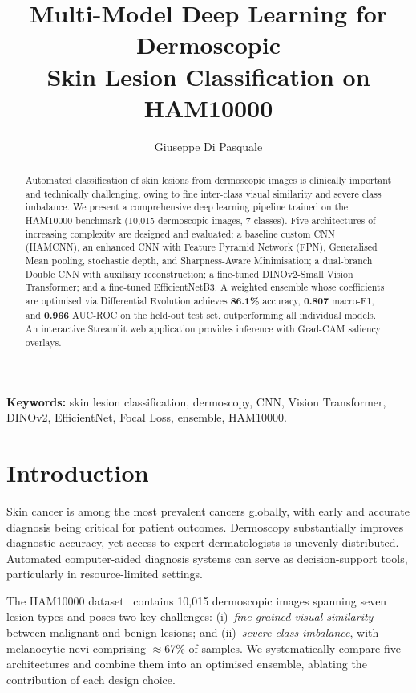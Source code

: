 \documentclass[10pt,twocolumn]{article}
\title{%
  \large\textbf{Multi-Model Deep Learning for Dermoscopic\\
  Skin Lesion Classification on HAM10000}
}
\author[1]{Giuseppe Di Pasquale}
\begin{document}
\maketitle
\thispagestyle{empty}

\begin{abstract}
Automated classification of skin lesions from dermoscopic images is clinically important and technically challenging, owing to fine inter-class visual similarity and severe class imbalance. We present a comprehensive deep learning pipeline trained on the HAM10000 benchmark (10,015 dermoscopic images, 7 classes). Five architectures of increasing complexity are designed and evaluated: a baseline custom CNN (HAMCNN), an enhanced CNN with Feature Pyramid Network (FPN), Generalised Mean pooling, stochastic depth, and Sharpness-Aware Minimisation; a dual-branch Double CNN with auxiliary reconstruction; a fine-tuned DINOv2-Small Vision Transformer; and a fine-tuned EfficientNetB3. A weighted ensemble whose coefficients are optimised via Differential Evolution achieves \textbf{86.1\%} accuracy, \textbf{0.807} macro-F1, and \textbf{0.966} AUC-ROC on the held-out test set, outperforming all individual models. An interactive Streamlit web application provides inference with Grad-CAM saliency overlays.
\end{abstract}

\noindent\textbf{Keywords:} skin lesion classification, dermoscopy, CNN, Vision Transformer, DINOv2, EfficientNet, Focal Loss, ensemble, HAM10000.

\section{Introduction}
\label{sec:intro}

Skin cancer is among the most prevalent cancers globally, with early and accurate diagnosis being critical for patient outcomes. Dermoscopy substantially improves diagnostic accuracy, yet access to expert dermatologists is unevenly distributed. Automated computer-aided diagnosis systems can serve as decision-support tools, particularly in resource-limited settings.

The HAM10000 dataset~\cite{tschandl2018ham10000} contains 10,015 dermoscopic images spanning seven lesion types and poses two key challenges: (i)~\textit{fine-grained visual similarity} between malignant and benign lesions; and (ii)~\textit{severe class imbalance}, with melanocytic nevi comprising $\approx$67\% of samples. We systematically compare five architectures and combine them into an optimised ensemble, ablating the contribution of each design choice.
\end{document}

